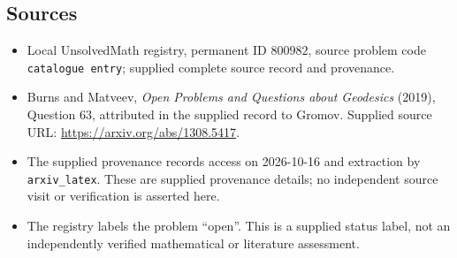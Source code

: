 \documentclass[11pt]{article}
\begin{document}
\subsection{Sources}
\begin{itemize}
\item Local UnsolvedMath registry, permanent ID \(800982\), source problem code \texttt{catalogue entry}; supplied complete source record and provenance.
\item Burns and Matveev, \emph{Open Problems and Questions about Geodesics} (2019), Question 63, attributed in the supplied record to Gromov. Supplied source URL: \url{https://arxiv.org/abs/1308.5417}.
\item The supplied provenance records access on 2026-10-16 and extraction by \texttt{arxiv\_latex}. These are supplied provenance details; no independent source visit or verification is asserted here.
\item The registry labels the problem ``open''. This is a supplied status label, not an independently verified mathematical or literature assessment.
\end{itemize}
\end{document}
